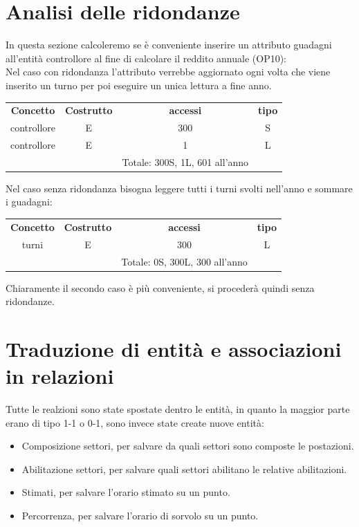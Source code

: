 \section{Analisi delle ridondanze}
In questa sezione calcoleremo se è conveniente inserire un attributo guadagni all'entità controllore al fine di calcolare il reddito annuale (OP10):\\
Nel caso con ridondanza l'attributo verrebbe aggiornato ogni volta che viene inserito un turno per poi eseguire un unica lettura a fine anno.
\begin{table}[H]
     \centering
     \begin{tabular}{cccc}
   
     \rowcolor{tableheadercolor}
     \textbf{Concetto} & \textbf{Costrutto} & \textbf{accessi} & \textbf{tipo}\\
   
     controllore & E & 300 & S \\
     controllore & E & 1 & L \\
     & & Totale: 300S, 1L, 601 all'anno &\\
   
     \end{tabular}
     \end{table}
Nel caso senza ridondanza bisogna leggere tutti i turni svolti nell'anno e sommare i guadagni:
\begin{table}[H]
     \centering
     \begin{tabular}{cccc}
   
     \rowcolor{tableheadercolor}
     \textbf{Concetto} & \textbf{Costrutto} & \textbf{accessi} & \textbf{tipo}\\
   
     turni & E & 300 & L \\
     & & Totale: 0S, 300L, 300 all'anno &\\
   
     \end{tabular}
     \end{table}

Chiaramente il secondo caso è più conveniente, si procederà quindi senza ridondanze.


\section{Traduzione di entità e associazioni in relazioni}
Tutte le realzioni sono state spostate dentro le entità, in quanto la maggior parte erano di tipo 1-1 o 0-1,
sono invece state create nuove entità:
\begin{itemize}
  \item Composizione settori, per salvare da quali settori sono composte le postazioni.
  \item Abilitazione settori, per salvare quali settori abilitano le relative abilitazioni.
  \item Stimati, per salvare l'orario stimato su un punto.
  \item Percorrenza, per salvare l'orario di sorvolo su un punto.
\end{itemize}


